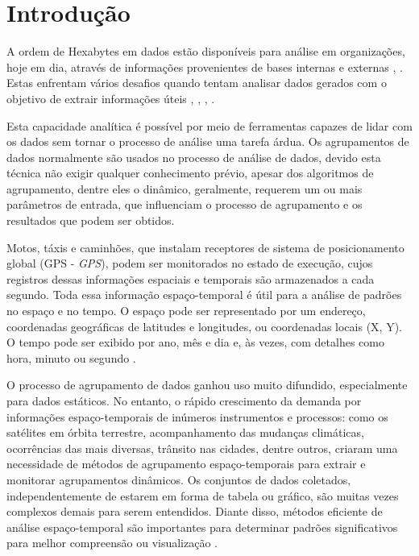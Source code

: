 \chapter{Introdução}
\label{chap:introducao}

A ordem de Hexabytes em dados estão disponíveis para análise em organizações, hoje em dia, através de informações provenientes de bases internas e externas \cite{google}, \cite{bing}. Estas enfrentam vários desafios quando tentam analisar dados gerados com o objetivo de extrair informações úteis \cite{Wu2008}, \cite{Mitsa:2010}, \cite{cheng:2014}, \cite{Atluri:2018}.

Esta capacidade analítica é possível por meio de ferramentas capazes de lidar com os dados sem tornar o processo de análise uma tarefa árdua. Os agrupamentos de dados normalmente são usados no processo de análise de dados, devido esta técnica não exigir qualquer conhecimento prévio, apesar dos algoritmos de agrupamento, dentre eles o dinâmico, geralmente, requerem um ou mais parâmetros de entrada, que influenciam o processo de agrupamento e os resultados que podem ser obtidos. 

Motos, táxis e caminhões, que instalam receptores de sistema de posicionamento global (\acrshort{GPS} - \emph{\acrlong{GPS}}), podem ser monitorados no estado de execução, cujos registros dessas informações espaciais e temporais são armazenados a cada segundo. Toda essa informação espaço-temporal é útil para a análise de padrões no espaço e no tempo. O espaço pode ser representado por um endereço, coordenadas geográficas de latitudes e longitudes, ou coordenadas locais (X, Y). O tempo pode ser exibido por ano, mês e dia e, às vezes, com detalhes como hora, minuto ou segundo \cite{Zhicheng:2019}.


O processo de agrupamento de dados ganhou uso muito difundido, especialmente para dados estáticos. No entanto, o rápido crescimento da demanda por informações espaço-temporais de inúmeros instrumentos e processos: como os satélites em órbita terrestre, acompanhamento das mudanças climáticas, ocorrências das mais diversas, trânsito nas cidades, dentre outros, criaram uma necessidade de métodos de agrupamento espaço-temporais para extrair e monitorar agrupamentos dinâmicos. Os conjuntos de dados coletados, independentemente de estarem em forma de tabela ou gráfico, são muitas vezes complexos demais para serem entendidos. Diante disso, métodos eficiente de análise espaço-temporal são importantes para determinar padrões significativos para melhor compreensão ou visualização \cite{Shekhar2011}.

